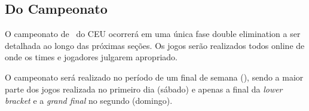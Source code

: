 \subsection{Do Campeonato}

O campeonato de \Modality\ do CEU ocorrerá em uma única fase double elimination a ser detalhada ao longo das próximas seções. Os jogos serão realizados todos online de onde os times e jogadores julgarem apropriado.

O campeonato será realizado no período de um final de semana (\FullDate), sendo a maior parte dos jogos realizada no primeiro dia (sábado) e apenas a final da \textit{lower bracket} e a \textit{grand final} no segundo (domingo).